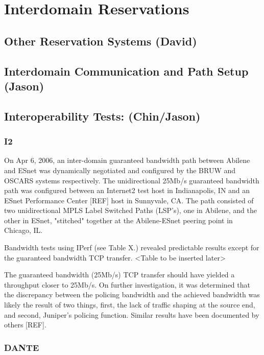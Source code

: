 \documentclass[conference]{IEEEtran}
\begin{document}
\section{Interdomain Reservations}

\subsection{Other Reservation Systems (David)}

\subsection{Interdomain Communication and Path Setup (Jason)}

\subsection{Interoperability Tests:  (Chin/Jason)}

\subsubsection{I2}
On Apr 6, 2006, an inter-domain guaranteed bandwidth path between Abilene and 
ESnet was dynamically negotiated and configured by the BRUW and OSCARS systems 
respectively. The unidirectional 25Mb/s guaranteed bandwidth path was 
configured between an Internet2 test host in Indianapolis, IN and an ESnet 
Performance Center [REF] host in Sunnyvale, CA.  The path consisted of two 
unidirectional MPLS Label Switched Paths (LSP's), one in Abilene, and the 
other in ESnet, "stitched" together at the Abilene-ESnet peering point in 
Chicago, IL.

Bandwidth tests using IPerf (see Table X.) revealed predictable results except 
for the guaranteed bandwidth TCP transfer.
<Table to be inserted later>

The guaranteed bandwidth (25Mb/s) TCP transfer should have yielded a throughput 
closer to 25Mb/s.  On further investigation, it was determined that the 
discrepancy between the policing bandwidth and the achieved bandwidth was 
likely the result of two things, first, the lack of traffic shaping at the 
source end, and second, Juniper's policing function.  Similar results have been 
documented by others [REF].

\subsubsection{DANTE}
\end{document}
